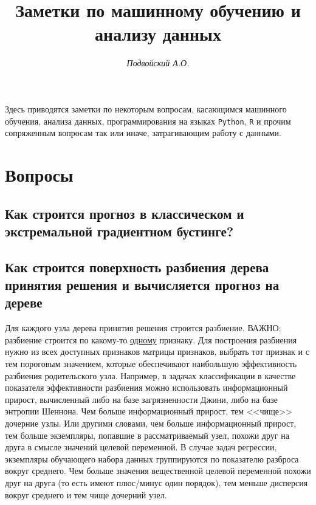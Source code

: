 \documentclass[%
	11pt,
	a4paper,
	utf8,
		]{article}
\begin{document}
\title{Заметки по машинному обучению и анализу данных}

\author{\itshape Подвойский А.О.}

\date{}
\maketitle

\thispagestyle{fancy}

Здесь приводятся заметки по некоторым вопросам, касающимся машинного обучения, анализа данных, программирования на языках \texttt{Python}, \texttt{R} и прочим сопряженным вопросам так или иначе, затрагивающим работу с данными.



\tableofcontents

\section{Вопросы}

\subsection{Как строится прогноз в классическом и экстремальной градиентном бустинге?}

\subsection{Как строится поверхность разбиения дерева принятия решения и вычисляется прогноз на дереве}

Для каждого узла дерева принятия решения строится разбиение. ВАЖНО: разбиение строится по какому-то \underline{одному} признаку. Для построения разбиения нужно из всех доступных признаков матрицы признаков, выбрать тот признак и с тем пороговым значением, которые обеспечивают наибольшую эффективность разбиения родительского узла. Например, в задачах классификации в качестве показателя эффективности разбиения можно использовать информационный прирост, вычисленный либо на базе загрязненности Джини, либо на базе энтропии Шеннона. Чем больше информационный прирост, тем <<чище>> дочерние узлы. Или другими словами, чем больше информационный прирост, тем больше экземпляры, попавшие в рассматриваемый узел, похожи друг на друга в смысле значений целевой переменной. В случае задач регрессии, экземпляры обучающего набора данных группируются по показателю разброса вокруг среднего. Чем больше значения вещественной целевой переменной похожи друг на друга (то есть имеют плюс/минус один порядок), тем меньше дисперсия вокруг среднего и тем чище дочерний узел. 
\end{document}
